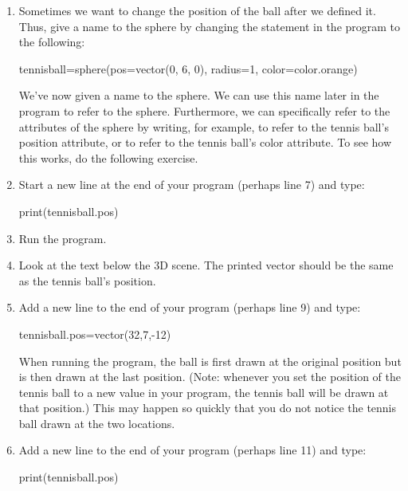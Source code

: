 \begin{enumerate}
	\item Sometimes we want to change the position of the ball after we defined it. Thus, give a name to the sphere by changing the  statement in the program to the following:

\begin{myvpython}
tennisball=sphere(pos=vector(0, 6, 0), radius=1, color=color.orange)
\end{myvpython}

We've now given a name to the sphere. We can use this name later in the program to refer to the sphere. Furthermore, we can specifically refer to the attributes of the sphere by writing, for example,  to refer to the tennis ball's position attribute, or  to refer to the tennis ball's color attribute. To see how this works, do the following exercise.

	\item Start a new line at the end of your program (perhaps line 7) and type:

\begin{myvpython}
print(tennisball.pos)
\end{myvpython}


	\item Run the program.

	\item Look at the text below the 3D scene. The printed vector should be the same as the tennis ball's position.

	\item Add a new line to the end of your program (perhaps line 9) and type:
	
\begin{myvpython}
tennisball.pos=vector(32,7,-12)
\end{myvpython}
	
	When running the program, the ball is first drawn at the original position but is then drawn at the last position. (Note: whenever you set the position of the tennis ball to a new value in your program, the tennis ball will be drawn at that position.) This may happen so quickly that you do not notice the tennis ball drawn at the two locations.
	
	\item Add a new line to the end of your program (perhaps line 11) and type:
	
\begin{myvpython}
print(tennisball.pos)
\end{myvpython}


\end{enumerate}
